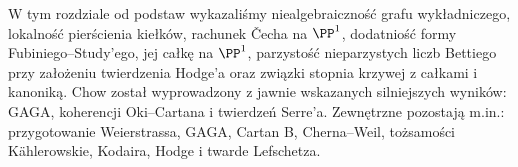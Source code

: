 \begin{uwaga}
W tym rozdziale od podstaw wykazaliśmy niealgebraiczność
grafu wykładniczego, lokalność pierścienia kiełków,
rachunek Čecha na $\PP^1$, dodatniość formy
Fubiniego--Study'ego, jej całkę na $\PP^1$,
parzystość nieparzystych liczb Bettiego przy
założeniu twierdzenia Hodge'a oraz związki
stopnia krzywej z całkami i kanoniką.
Chow został wyprowadzony z jawnie wskazanych
silniejszych wyników: GAGA, koherencji Oki--Cartana
i twierdzeń Serre'a. Zewnętrzne pozostają m.in.:
przygotowanie Weierstrassa, GAGA, Cartan B,
Cherna--Weil, tożsamości Kählerowskie,
Kodaira, Hodge i twarde Lefschetza.
\end{uwaga}



